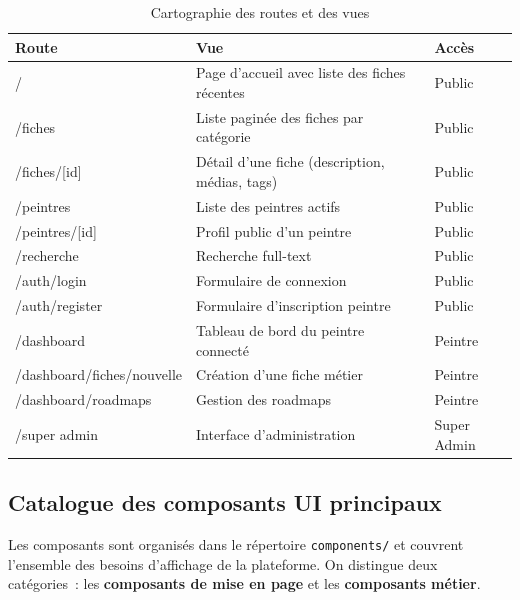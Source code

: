 \documentclass[12pt,a4paper]{report}
\begin{document}
\begin{table}[H]
\centering
\renewcommand{\arraystretch}{1.3}
\begin{tabularx}{\textwidth}{>{\ttfamily}l l >{\centering\arraybackslash}X}
\toprule
\normalfont\textbf{Route} & \textbf{Vue} & \textbf{Accès} \\
\midrule
/                          & Page d'accueil avec liste des fiches récentes           & Public  \\
/fiches                    & Liste paginée des fiches par catégorie                  & Public  \\
/fiches/[id]               & Détail d'une fiche (description, médias, tags)          & Public  \\
/peintres                  & Liste des peintres actifs                               & Public  \\
/peintres/[id]             & Profil public d'un peintre                              & Public  \\
/recherche                 & Recherche full-text                                     & Public  \\
/auth/login                & Formulaire de connexion                                 & Public  \\
/auth/register             & Formulaire d'inscription peintre                        & Public  \\
/dashboard                 & Tableau de bord du peintre connecté                     & Peintre \\
/dashboard/fiches/nouvelle & Création d'une fiche métier                             & Peintre \\
/dashboard/roadmaps        & Gestion des roadmaps                                    & Peintre \\
/super admin               & Interface d'administration                              & Super Admin   \\
\bottomrule
\end{tabularx}
\caption{Cartographie des routes et des vues}
\end{table}

\subsection{Catalogue des composants UI principaux}

Les composants sont organisés dans le répertoire \texttt{components/} et
couvrent l'ensemble des besoins d'affichage de la plateforme. On distingue
deux catégories~: les \textbf{composants de mise en page} et les
\textbf{composants métier}.
\end{document}
